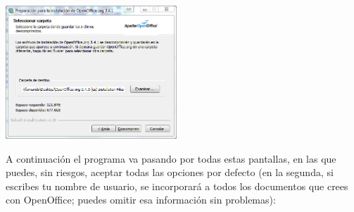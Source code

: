 \documentclass[10pt,a4paper]{article}\usepackage[]{graphicx}\usepackage[]{color}
\newcounter {cont01}
\begin{document}
    \begin{center}
    \includegraphics[height=5cm]{../fig/Tut00-WebOpenOffice-05.png}
    \end{center}
A continuación el programa va pasando por todas estas pantallas, en las que puedes, sin riesgos,
aceptar todas las opciones por defecto (en la segunda, si escribes tu nombre de usuario, se
incorporará a todos los documentos que crees con OpenOffice; puedes omitir esa información sin
problemas):
\end{document}
